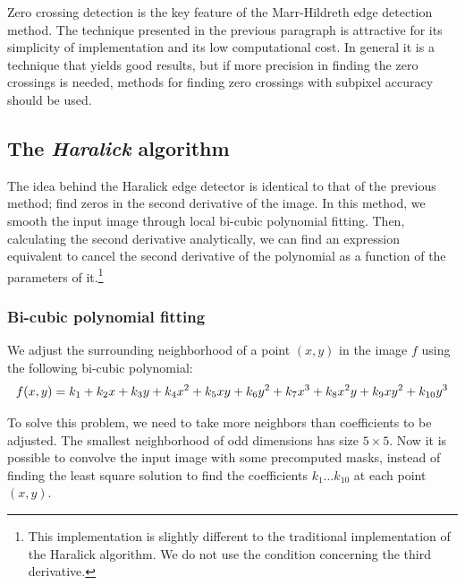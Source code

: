\documentclass{ipol}
\numberwithin{equation}{section}
\numberwithin{table}{section}
\numberwithin{figure}{section}
\begin{document}
Zero crossing detection is the key feature of the Marr-Hildreth edge detection method. The technique 
presented in the previous paragraph is attractive for its simplicity of implementation and its low 
computational cost. In general it is a technique that yields good results, but if more precision in 
finding the zero crossings is needed, methods for finding zero crossings with subpixel accuracy 
should be used.\\

\subsection{The \textit{Haralick} algorithm}

The idea behind the Haralick edge detector is identical to that of the previous method; find zeros in 
the second derivative of the image. In this method, we smooth the input image through local bi-cubic
polynomial fitting. Then, calculating the second derivative analytically, we can find an expression 
equivalent to cancel the second derivative of the polynomial as a function of the parameters of it.\footnote{This implementation is slightly 
different to the traditional implementation of the Haralick algorithm. We do not use the condition concerning the third derivative.}\\

\subsubsection{Bi-cubic polynomial fitting}
\label{sec:bicubic}

We adjust the surrounding neighborhood of a point $(x,y)$ in the image $f$ using the following bi-cubic polynomial:
\begin{equation}
	\label{eq:bicubic}
	f(x,y) = k_1 + k_2x + k_3y + k_4x^2 + k_5xy + k_6y^2 + k_7x^3 + k_8x^2y + k_9xy^2 + k_{10}y^3\\
\end{equation}

To solve this problem, we need to take more neighbors than coefficients to be adjusted. The smallest 
neighborhood of odd dimensions has size $5\times5$. Now it is possible to convolve the input image
with some precomputed masks, instead of finding the least square solution to find the coefficients 
$k_1\dots k_{10}$ at each point $(x,y)$.\\
\end{document}
